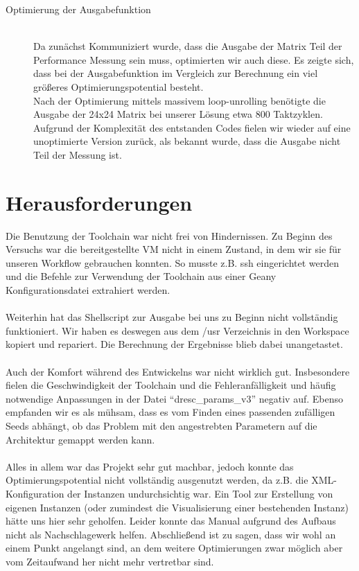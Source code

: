 \documentclass[oneside,11pt,accentcolor=tud2b, nochapname]{tudexercise}
\begin{document}
\begin{description}
	\item[Optimierung der Ausgabefunktion] \hfill \\
	Da zunächst Kommuniziert wurde, dass die Ausgabe der Matrix Teil der Performance Messung sein muss, optimierten wir auch diese.
	Es zeigte sich, dass bei der Ausgabefunktion im Vergleich zur Berechnung ein viel größeres Optimierungspotential besteht.\\
	Nach der Optimierung mittels massivem loop-unrolling benötigte die Ausgabe der 24x24 Matrix bei unserer Lösung etwa 800 Taktzyklen.
	Aufgrund der Komplexität des entstanden Codes fielen wir wieder auf eine unoptimierte Version zurück, als bekannt wurde, dass die Ausgabe nicht Teil der Messung ist.
	
\end{description}


\section*{Herausforderungen}

Die Benutzung der Toolchain war nicht frei von Hindernissen.
Zu Beginn des Versuchs war die bereitgestellte VM nicht in einem Zustand, in dem wir sie für unseren Workflow gebrauchen konnten.
So musste z.B. ssh eingerichtet werden und die Befehle zur Verwendung der Toolchain aus einer Geany Konfigurationsdatei extrahiert werden.\\
\\
Weiterhin hat das Shellscript zur Ausgabe bei uns zu Beginn nicht vollständig funktioniert. 
Wir haben es deswegen aus dem /usr Verzeichnis in den Workspace kopiert und repariert.
Die Berechnung der Ergebnisse blieb dabei unangetastet.\\
\\
Auch der Komfort während des Entwickelns war nicht wirklich gut.
Insbesondere fielen die Geschwindigkeit der Toolchain und die Fehleranfälligkeit und häufig notwendige Anpassungen in der Datei "`dresc\_params\_v3"' negativ auf.
Ebenso empfanden wir es als mühsam, dass es vom Finden eines passenden zufälligen Seeds abhängt, ob das Problem mit den angestrebten Parametern auf die Architektur gemappt werden kann.\\
\\
Alles in allem war das Projekt sehr gut machbar, jedoch konnte das Optimierungspotential nicht vollständig ausgenutzt werden, da z.B. die XML-Konfiguration der Instanzen undurchsichtig war.
Ein Tool zur Erstellung von eigenen Instanzen (oder zumindest die Visualisierung einer bestehenden Instanz) hätte uns hier sehr geholfen.
Leider konnte das Manual aufgrund des Aufbaus nicht als Nachschlagewerk helfen.
Abschließend ist zu sagen, dass wir wohl an einem Punkt angelangt sind, an dem weitere Optimierungen zwar möglich aber vom Zeitaufwand her nicht mehr vertretbar sind.
\end{document}
